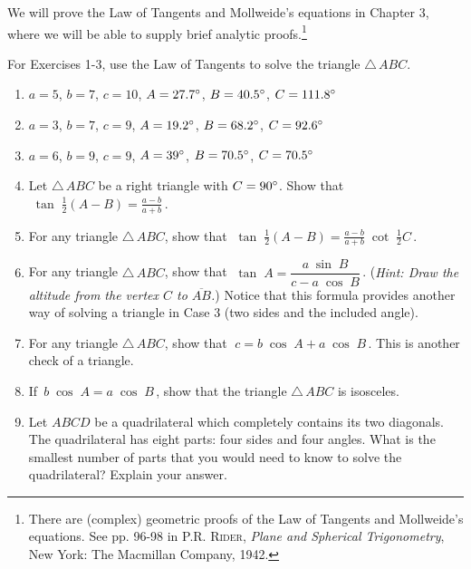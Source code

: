 We will prove the Law of Tangents and Mollweide's equations in Chapter 3, where we will be able to
supply brief analytic proofs.\footnote{There are (complex) geometric proofs of the Law of
Tangents and Mollweide's equations. See pp. 96-98 in \textsc{P.R. Rider}, \emph{Plane and Spherical
Trigonometry}, New York: The Macmillan Company, 1942.}

\divider
\vspace{2mm}

\startexercises\label{sec2dot3}
\vspace{4mm}
{\small
\par\noindent For Exercises 1-3, use the Law of Tangents to solve the triangle $\triangle\,ABC$.
\begin{enumerate}[\bfseries 1.]
For Exercises 4-6, check if it is possible for a triangle to have the given parts.
[{[\bfseries 1.]}]
 \item $a=5$, $b=7$, $c=10$, $A=27.7^\circ$, $B=40.5^\circ$, $C=111.8^\circ$
 \item $a=3$, $b=7$, $c=9$, $A=19.2^\circ$, $B=68.2^\circ$, $C=92.6^\circ$
 \item $a=6$, $b=9$, $c=9$, $A=39^\circ$, $B=70.5^\circ$, $C=70.5^\circ$
 \item Let $\triangle\,ABC$ be a right triangle with $C=90^\circ$. Show that
  $\;\tan\;\frac{1}{2}(A-B) =\frac{a-b}{a+b}\,$.
 \item For any triangle $\triangle\,ABC$, show that $\;\tan\;\frac{1}{2}(A-B) =
  \frac{a-b}{a+b}\;\cot\;\frac{1}{2}C\,$.
 \item For any triangle $\triangle\,ABC$, show that
  $\;\tan\;A = \dfrac{a\;\sin\;B}{c - a\;\cos\;B}\,$.
  (\emph{Hint: Draw the altitude from the vertex $C$ to $\overline{AB}$.}) Notice that this
  formula provides another way of solving a triangle in Case 3 (two sides and the included angle).
 \item For any triangle $\triangle\,ABC$, show that $\;c = b\;\cos\;A + a\;\cos\;B\,$. This is
  another check of a triangle.
 \item If $\,b\;\cos\;A = a\;\cos\;B\,$, show that the triangle $\triangle\,ABC$ is isosceles.
 \item Let $ABCD$ be a quadrilateral which completely contains its two diagonals. The quadrilateral
 has eight parts: four sides and four angles. What is the smallest number of parts that you would
 need to know to solve the quadrilateral? Explain your answer.
\end{enumerate}}
\newpage
